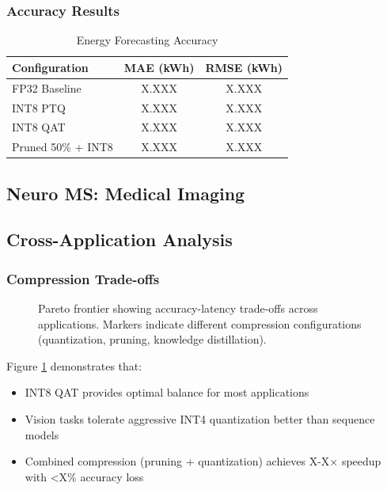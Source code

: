 \subsubsection{Accuracy Results}

\begin{table}[h]
\centering
\caption{Energy Forecasting Accuracy}
\label{tab:energy_accuracy}
\begin{tabular}{lcc}
\hline
\textbf{Configuration} & \textbf{MAE (kWh)} & \textbf{RMSE (kWh)} \\
\hline
FP32 Baseline & X.XXX & X.XXX \\
INT8 PTQ & X.XXX & X.XXX \\
INT8 QAT & X.XXX & X.XXX \\
Pruned 50\% + INT8 & X.XXX & X.XXX \\
\hline
\end{tabular}
\end{table}

\subsection{Neuro MS: Medical Imaging}


\subsection{Cross-Application Analysis}

\subsubsection{Compression Trade-offs}

\begin{figure}[h]
\centering
\resizebox{0.48\textwidth}{!}{}
\caption{Pareto frontier showing accuracy-latency trade-offs across applications. Markers indicate different compression configurations (quantization, pruning, knowledge distillation).}
\label{fig:pareto}
\end{figure}

Figure \ref{fig:pareto} demonstrates that:
\begin{itemize}
\item INT8 QAT provides optimal balance for most applications
\item Vision tasks tolerate aggressive INT4 quantization better than sequence models
\item Combined compression (pruning + quantization) achieves X-X$\times$ speedup with <X\% accuracy loss
\end{itemize}

